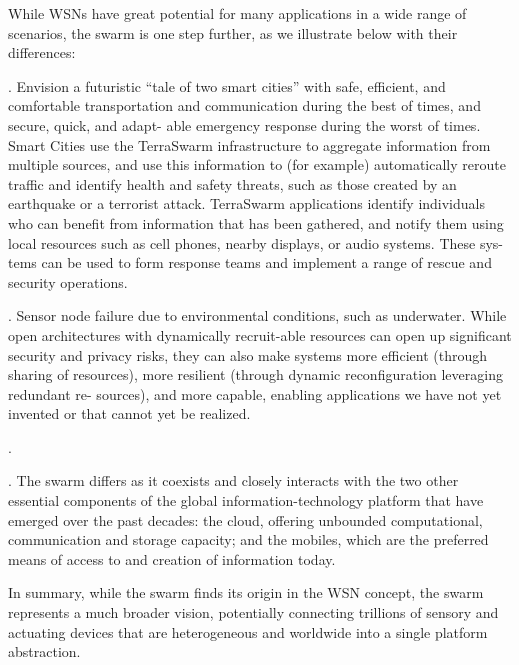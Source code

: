 While WSNs have great potential for many applications in a wide range of
scenarios, the swarm is one step further, as we illustrate below with their
differences:

.
Envision a futuristic “tale of two smart cities” with safe, efficient, and
comfortable transportation and communication during the best of times, and
secure, quick, and adapt- able emergency response during the worst of
times. Smart Cities use the TerraSwarm infrastructure to aggregate information
from multiple sources, and use this information to (for example) automatically
reroute traffic and identify health and safety threats, such as those created by
an earthquake or a terrorist attack. TerraSwarm applications identify
individuals who can benefit from information that has been gathered, and notify
them using local resources such as cell phones, nearby displays, or audio
systems. These sys- tems can be used to form response teams and implement a
range of rescue and security operations.

. Sensor node failure due to environmental conditions, such as
underwater. While open architectures with dynamically recruit-able resources can
open up significant security and privacy risks, they can also make systems more
efficient (through sharing of resources), more resilient (through dynamic
reconfiguration leveraging redundant re- sources), and more capable, enabling
applications we have not yet invented or that cannot yet be realized.

.

. The swarm differs as it coexists and closely interacts with
the two other essential components of the global information-technology platform
that have emerged over the past decades: the cloud, offering unbounded
computational, communication and storage capacity; and the mobiles, which are
the preferred means of access to and creation of information today.

In summary, while the swarm finds its origin in the WSN concept, the swarm
represents a much broader vision, potentially connecting trillions of sensory
and actuating devices that are heterogeneous and worldwide into a single
platform abstraction.

